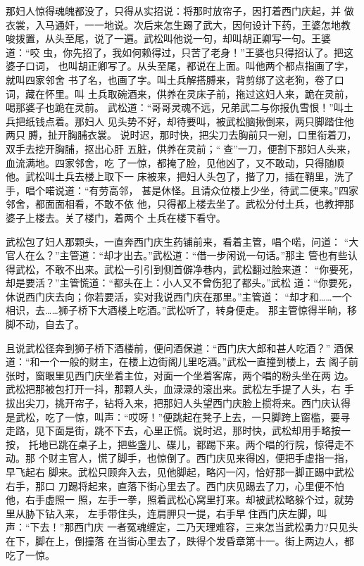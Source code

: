 那妇人惊得魂魄都没了，只得从实招说：将那时放帘子，因打着西门庆起，并
做衣裳，入马通奸，一一地说。次后来怎生踢了武大，因何设计下药，王婆怎地教
唆拨置，从头至尾，说了一遍。武松叫他说一句，却叫胡正卿写一句。王婆道：“咬
虫，你先招了，我如何赖得过，只苦了老身！”王婆也只得招认了。把这婆子口词，
也叫胡正卿写了。从头至尾，都说在上面。叫他两个都点指画了字，就叫四家邻舍
书了名，也画了字。叫土兵解搭膊来，背剪绑了这老狗，卷了口词，藏在怀里。叫
土兵取碗酒来，供养在灵床子前，拖过这妇人来，跪在灵前，喝那婆子也跪在灵前。
武松道：“哥哥灵魂不远，兄弟武二与你报仇雪恨！”叫土兵把纸钱点着。那妇人
见头势不好，却待要叫，被武松脑揪倒来，两只脚踏住他两只膊，扯开胸脯衣裳。
说时迟，那时快，把尖刀去胸前只一剜，口里衔着刀，双手去挖开胸脯，抠出心肝
五脏，供养在灵前；“查”一刀，便割下那妇人头来，血流满地。四家邻舍，吃
了一惊，都掩了脸，见他凶了，又不敢动，只得随顺他。武松叫土兵去楼上取下一
床被来，把妇人头包了，揩了刀，插在鞘里，洗了手，唱个喏说道：“有劳高邻，
甚是休怪。且请众位楼上少坐，待武二便来。”四家邻舍，都面面相看，不敢不依
他，只得都上楼去坐了。武松分付土兵，也教押那婆子上楼去。关了楼门，着两个
土兵在楼下看守。

武松包了妇人那颗头，一直奔西门庆生药铺前来，看着主管，唱个喏，问道：
“大官人在么？”主管道：“却才出去。”武松道：“借一步闲说一句话。”那主
管也有些认得武松，不敢不出来。武松一引引到侧首僻净巷内，武松翻过脸来道：
“你要死，却是要活？”主管慌道：“都头在上：小人又不曾伤犯了都头。”武松
道：“你要死，休说西门庆去向；你若要活，实对我说西门庆在那里。”主管道：
“却才和……一个相识，去……狮子桥下大酒楼上吃酒。”武松听了，转身便走。
那主管惊得半晌，移脚不动，自去了。

且说武松径奔到狮子桥下酒楼前，便问酒保道：“西门庆大郎和甚人吃酒？”
酒保道：“和一个一般的财主，在楼上边街阁儿里吃酒。”武松一直撞到楼上，去
阁子前张时，窗眼里见西门庆坐着主位，对面一个坐着客席，两个唱的粉头坐在两
边。武松把那被包打开一抖，那颗人头，血渌渌的滚出来。武松左手提了人头，右
手拔出尖刀，挑开帘子，钻将入来，把那妇人头望西门庆脸上掼将来。西门庆认得
是武松，吃了一惊，叫声：“哎呀！”便跳起在凳子上去，一只脚跨上窗槛，要寻
走路，见下面是街，跳不下去，心里正慌。说时迟，那时快，武松却用手略按一按，
托地已跳在桌子上，把些盏儿、碟儿，都踢下来。两个唱的行院，惊得走不动。那
个财主官人，慌了脚手，也惊倒了。西门庆见来得凶，便把手虚指一指，早飞起右
脚来。武松只顾奔入去，见他脚起，略闪一闪，恰好那一脚正踢中武松右手，那口
刀踢将起来，直落下街心里去了。西门庆见踢去了刀，心里便不怕他，右手虚照一
照，左手一拳，照着武松心窝里打来。却被武松略躲个过，就势里从胁下钻入来，
左手带住头，连肩胛只一提，右手早住西门庆左脚，叫声：“下去！”那西门庆
一者冤魂缠定，二乃天理难容，三来怎当武松勇力?只见头在下，脚在上，倒撞落
在当街心里去了，跌得个发昏章第十一。街上两边人，都吃了一惊。

